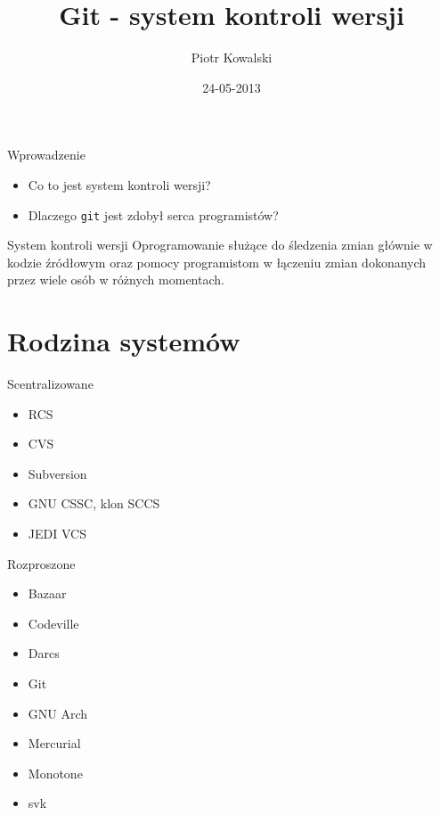 \documentclass{beamer}
\title[Git]{Git - system kontroli wersji}
\author{Piotr Kowalski}
\institute{Redefine Sp. z o.o}
\date{24-05-2013}
\begin{document}
\begin{frame}
  \titlepage
\end{frame}

\begin{frame}{Wprowadzenie}
\begin{itemize}
  \item Co to jest system kontroli wersji?
  \item Dlaczego \texttt{git} jest zdobył serca programistów?
\end{itemize}

\vskip 1cm

\begin{block}{System kontroli wersji}
Oprogramowanie służące do śledzenia zmian głównie w kodzie źródłowym oraz pomocy programistom w łączeniu zmian dokonanych przez wiele osób w różnych momentach.
\end{block}
\end{frame}

\section{Rodzina systemów}

\begin{frame}{Scentralizowane}
\begin{itemize}
	\item RCS
	\item CVS
	\item Subversion
	\item GNU CSSC, klon SCCS
	\item JEDI VCS
\end{itemize}
\end{frame}

\begin{frame}{Rozproszone}
\begin{itemize}
	\item Bazaar
	\item Codeville
	\item Darcs
	\item Git
	\item GNU Arch
	\item Mercurial
	\item Monotone
	\item svk
\end{itemize}
\end{frame}
\end{document}
